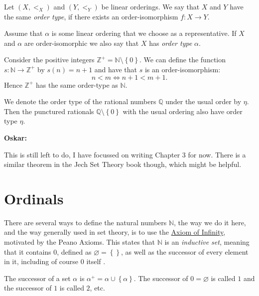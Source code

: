 \documentclass[../../main.tex]{subfiles}
\begin{document}
\begin{definition}\cite[Definitions 1.12, 1.13]{Ros82}
    Let $(X, <_X)$ and $(Y, <_Y)$ be linear orderings.
    We say that $X$ and $Y$ have the same \textit{order type}, if there exists an order-isomorphism $f: X \to Y$.

    Assume that $\alpha$ is some linear ordering that we choose as a representative.
    If $X$ and $\alpha$ are order-isomorphic we also say that $X$ has \textit{order type} $\alpha$.
\end{definition}

\begin{example}
    Consider the positive integers $\mathbb{Z}^+ = \mathbb{N} \setminus \left\{0\right\}$.
    We can define the function $s: \mathbb{N} \to \mathbb{Z^+}$ by $s(n) = n + 1$ and have that $s$ is an order-isomorphism:
    $$n < m \iff n+1 < m+1.$$
    Hence $\mathbb{Z}^+$ has the same order-type as $\mathbb{N}$.
\end{example}

\begin{example}\cite[Exercise 2.3]{Ros82}
    We denote the order type of the rational numbers $\mathbb{Q}$ under the usual order by $\eta$.
    Then the punctured rationals $\mathbb{Q} \setminus \left\{0\right\}$ with the usual ordering also have order type $\eta$.
\end{example}
\textbf{Oskar:}

This is still left to do, I have focussed on writing Chapter 3 for now.
There is a similar theorem in the Jech Set Theory book \cite{Jec78} though, which might be helpful.

\section{Ordinals}\label{ordinals-section}
There are several ways to define the natural numbers $\mathbb{N}$, the way we do it here, and the way generally used in set theory, is to use the \hyperref[ZF7]{Axiom of Infinity}, motivated by the Peano Axioms.
This states that $\mathbb{N}$ is an \textit{inductive set}, meaning that it contains $0$, defined as $\varnothing = \left\{\right\}$, as well as the successor of every element in it, including of course $0$ itself \cite[p.39]{Gol17}.

\begin{definition}\cite[p.38]{Gol17}
    The successor of a set $\alpha$ is $\alpha^+ = \alpha \cup \left\{\alpha\right\}$.
    The successor of $0 = \varnothing$ is called $1$ and the successor of $1$ is called $2$, etc.
\end{definition}
\end{document}
